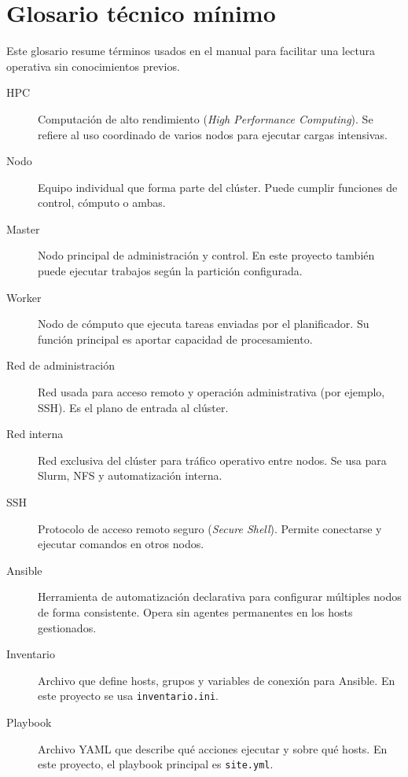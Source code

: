 \chapter{Glosario técnico mínimo}
\label{chap:glosario}

Este glosario resume términos usados en el manual para facilitar una lectura operativa sin conocimientos previos.

\begin{description}
  \item[HPC] Computación de alto rendimiento (\textit{High Performance Computing}). Se refiere al uso coordinado de varios nodos para ejecutar cargas intensivas.

  \item[Nodo] Equipo individual que forma parte del clúster. Puede cumplir funciones de control, cómputo o ambas.

  \item[Master] Nodo principal de administración y control. En este proyecto también puede ejecutar trabajos según la partición configurada.

  \item[Worker] Nodo de cómputo que ejecuta tareas enviadas por el planificador. Su función principal es aportar capacidad de procesamiento.

  \item[Red de administración] Red usada para acceso remoto y operación administrativa (por ejemplo, SSH). Es el plano de entrada al clúster.

  \item[Red interna] Red exclusiva del clúster para tráfico operativo entre nodos. Se usa para Slurm, NFS y automatización interna.

  \item[SSH] Protocolo de acceso remoto seguro (\textit{Secure Shell}). Permite conectarse y ejecutar comandos en otros nodos.

  \item[Ansible] Herramienta de automatización declarativa para configurar múltiples nodos de forma consistente. Opera sin agentes permanentes en los hosts gestionados.

  \item[Inventario] Archivo que define hosts, grupos y variables de conexión para Ansible. En este proyecto se usa \texttt{inventario.ini}.

  \item[Playbook] Archivo YAML que describe qué acciones ejecutar y sobre qué hosts. En este proyecto, el playbook principal es \texttt{site.yml}.


\end{description}

